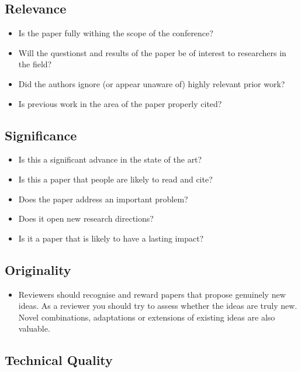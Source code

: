 \documentclass[a4paper]{article}
\begin{document}
\subsection{Relevance}

\begin{itemize}
	\item Is the paper fully withing the scope of the conference?
	\item Will the questionst and results of the paper be of interest to researchers in the field?
	\item Did the authors ignore (or appear unaware of) highly relevant prior work?
	\item Is previous work in the area of the paper properly cited?
\end{itemize}


\subsection{Significance}

\begin{itemize}
	\item Is this a significant advance in the state of the art?
	\item Is this a paper that people are likely to read and cite?
	\item Does the paper address an important problem?
	\item Does it open new research directions?
	\item Is it a paper that is likely to have a lasting impact?
\end{itemize}

\subsection{Originality}

\begin{itemize}
	\item Reviewers should recognise and reward papers that propose genuinely new ideas. As a reviewer you should try to assess whether the ideas are truly new. Novel combinations, adaptations or extensions of existing ideas are also valuable.
\end{itemize}


\subsection{Technical Quality}
\end{document}
